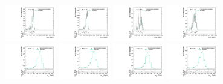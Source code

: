 \begin{figure}[htpb]
  \includegraphics[width=0.2\textwidth]{fig/2Dfit/templateVsReco_WprToWH2000_r0_MVV_mu_HP_vbf_LDy_linear.pdf}
  \includegraphics[width=0.2\textwidth]{fig/2Dfit/templateVsReco_WprToWH2000_r0_MVV_mu_LP_vbf_LDy_linear.pdf}
  \includegraphics[width=0.2\textwidth]{fig/2Dfit/templateVsReco_WprToWH2000_r0_MVV_mu_HP_vbf_HDy_linear.pdf}
  \includegraphics[width=0.2\textwidth]{fig/2Dfit/templateVsReco_WprToWH2000_r0_MVV_mu_LP_vbf_HDy_linear.pdf}\\
  \includegraphics[width=0.2\textwidth]{fig/2Dfit/templateVsReco_WprToWH2000_r0_MJ_mu_HP_bb_LDy.pdf}
  \includegraphics[width=0.2\textwidth]{fig/2Dfit/templateVsReco_WprToWH2000_r0_MJ_mu_LP_bb_LDy.pdf}
  \includegraphics[width=0.2\textwidth]{fig/2Dfit/templateVsReco_WprToWH2000_r0_MJ_mu_HP_bb_HDy.pdf}
  \includegraphics[width=0.2\textwidth]{fig/2Dfit/templateVsReco_WprToWH2000_r0_MJ_mu_LP_bb_HDy.pdf}\\

\end{figure}
